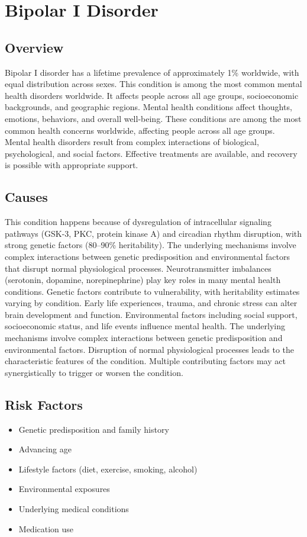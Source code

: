 \chapter{Bipolar I Disorder}
\label{sec:Bipolar I Disorder}

\section{Overview}
Bipolar I disorder has a lifetime prevalence of approximately 1\% worldwide, with equal distribution across sexes. This condition is among the most common mental health disorders worldwide. It affects people across all age groups, socioeconomic backgrounds, and geographic regions. Mental health conditions affect thoughts, emotions, behaviors, and overall well-being. These conditions are among the most common health concerns worldwide, affecting people across all age groups. Mental health disorders result from complex interactions of biological, psychological, and social factors. Effective treatments are available, and recovery is possible with appropriate support.
\section{Causes}
This condition happens because of dysregulation of intracellular signaling pathways (GSK-3, PKC, protein kinase A) and circadian rhythm disruption, with strong genetic factors (80--90\% heritability). The underlying mechanisms involve complex interactions between genetic predisposition and environmental factors that disrupt normal physiological processes. Neurotransmitter imbalances (serotonin, dopamine, norepinephrine) play key roles in many mental health conditions. Genetic factors contribute to vulnerability, with heritability estimates varying by condition. Early life experiences, trauma, and chronic stress can alter brain development and function. Environmental factors including social support, socioeconomic status, and life events influence mental health. The underlying mechanisms involve complex interactions between genetic predisposition and environmental factors. Disruption of normal physiological processes leads to the characteristic features of the condition. Multiple contributing factors may act synergistically to trigger or worsen the condition.
\section{Risk Factors}
\begin{itemize}[noitemsep]
  \item Genetic predisposition and family history
  \item Advancing age
  \item Lifestyle factors (diet, exercise, smoking, alcohol)
  \item Environmental exposures
  \item Underlying medical conditions
  \item Medication use
\end{itemize}
